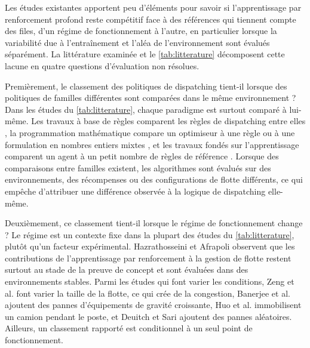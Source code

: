 \documentclass[11pt,a4paper]{article}
\newif\ifrevmarks
\newcommand{\revtag}[1]{\ifrevmarks\textsuperscript{\textcolor{red!70!black}{\scriptsize[#1]}}\fi}
\newenvironment{revbloc}[1]{\par\ifrevmarks\color{revcolor}\noindent\revtag{#1}\ \fi}{\par}
\newif\ifcorrmarks
\newcommand{\corr}[1]{\ifcorrmarks\textcolor{corrcolor}{#1}\else#1\fi}
\begin{document}
\begin{revbloc}{M24 (fusion §1.3, §2.4, §3)}
\corr{Les études existantes apportent peu d'éléments pour savoir si l'apprentissage par renforcement profond reste compétitif face à des références qui tiennent compte des files, d'un régime de fonctionnement à l'autre, en particulier lorsque la variabilité due à l'entraînement et l'aléa de l'environnement sont évalués séparément. La littérature examinée et le \cref{tab:litterature} décomposent cette lacune en quatre questions d'évaluation non résolues.}

\corr{Premièrement, le classement des politiques de dispatching tient-il lorsque des politiques de familles différentes sont comparées dans le même environnement ?} \corr{Dans les études du \cref{tab:litterature}, chaque paradigme est surtout comparé à lui-même.} Les travaux à base de règles comparent les règles de dispatching entre elles \cite{Alarie2002, MehrnazMohtasham2023, Zeng2022}, la programmation mathématique compare un optimiseur à une règle ou à une formulation en nombres entiers mixtes \cite{Soumis1989, AmandaSmith2020}, et les travaux fondés sur l'apprentissage comparent un agent à un petit nombre de règles de référence \cite{deCarvalho2023, Zhao2025}. Lorsque des comparaisons entre familles existent, les algorithmes sont évalués sur des environnements, des récompenses ou des configurations de flotte différents, ce qui empêche d'attribuer une différence observée à la logique de dispatching elle-même.

\corr{Deuxièmement, ce classement tient-il lorsque le régime de fonctionnement change ? Le régime} \corr{est un contexte fixe dans la plupart des études du \cref{tab:litterature}, plutôt qu'un facteur expérimental. Hazrathosseini et Afrapoli \cite{Hazrathosseini2024} observent que les contributions de l'apprentissage par renforcement à la gestion de flotte restent surtout au stade de la preuve de concept et sont évaluées dans des environnements stables. Parmi les études qui font varier les conditions, Zeng et al. \cite{Zeng2022} font varier la taille de la flotte, ce qui crée de la congestion, Banerjee et al. \cite{Banerjee2025} ajoutent des pannes d'équipements de gravité croissante, Huo et al. \cite{Huo2024} immobilisent un camion pendant le poste, et Deuitch et Sari \cite{Deuitch2026} ajoutent des pannes aléatoires. Ailleurs, un classement rapporté est conditionnel à un seul point de fonctionnement.}


\end{revbloc}
\end{document}
